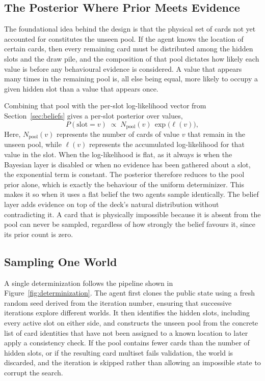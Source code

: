 \documentclass[12pt,a4paper,oneside]{report}
\begin{document}
\subsection{The Posterior Where Prior Meets Evidence}
 
The foundational idea behind the design is that the physical set of cards not yet accounted for constitutes the unseen pool. If the agent knows the location of certain cards, then every remaining card must be distributed among the hidden slots and the draw pile, and the composition of that pool dictates how likely each value is before any behavioural evidence is considered. A value that appears many times in the remaining pool is, all else being equal, more likely to occupy a given hidden slot than a value that appears once.
 
Combining that pool with the per-slot log-likelihood vector from Section~\ref{sec:beliefs} gives a per-slot posterior over values,
%
\begin{equation}
  P(\text{slot} = v) \;\propto\; N_{\text{pool}}(v)\,\exp\!\big(\ell(v)\big),
  \label{eq:posterior}
\end{equation}
%
Here, $N_{\text{pool}}(v)$ represents the number of cards of value $v$ that remain in the unseen pool, while $\ell(v)$ represents the accumulated log-likelihood for that value in the slot. When the log-likelihood is flat, as it always is when the Bayesian layer is disabled or when no evidence has been gathered about a slot, the exponential term is constant. The posterior therefore reduces to the pool prior alone, which is exactly the behaviour of the uniform determinizer. This makes it so when it uses a flat belief the two agents sample identically. The belief layer adds evidence on top of the deck's natural distribution without contradicting it. A card that is physically impossible because it is absent from the pool can never be sampled, regardless of how strongly the belief favours it, since its prior count is zero.

 
\subsection{Sampling One World}
 
A single determinization follows the pipeline shown in Figure~\ref{fig:determinization}. The agent first clones the public state using a fresh random seed derived from the iteration number, ensuring that successive iterations explore different worlds. It then identifies the hidden slots, including every active slot on either side, and constructs the unseen pool from the concrete list of card identities that have not been assigned to a known location to later apply a consistency check. If the pool contains fewer cards than the number of hidden slots, or if the resulting card multiset fails validation, the world is discarded, and the iteration is skipped rather than allowing an impossible state to corrupt the search.
 
\end{document}
